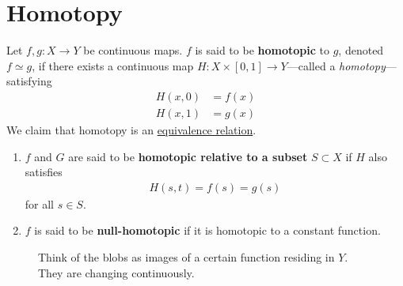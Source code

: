 \section{Homotopy} 

	\begin{definition}[Homotopy]
	  \label{def:homotopy}
		Let $f, g: X \to Y$ be continuous maps. $f$ is said to be \textbf{homotopic} to $g$, denoted $f \simeq g$, if there exists a continuous map $H: X \times [0, 1] \to Y$---called a \textit{homotopy}---satisfying 
		\begin{align}
			H(x, 0) & = f(x) \\ 
			H(x, 1) & = g(x) 
		\end{align}
		We claim that homotopy is an \hyperref[st-def:equivalence_relation]{equivalence relation}. 
		\begin{enumerate}
		  \item $f$ and $G$ are said to be \textbf{homotopic relative to a subset} $S \subset X$ if $H$ also satisfies 
				\begin{align}
					H(s, t) = f(s) = g(s)
				\end{align}
				for all $s \in S$. 

			\item $f$ is said to be \textbf{null-homotopic} if it is homotopic to a constant function. 
		\end{enumerate}

    \begin{figure}[H]
      \centering 
      \caption{Think of the blobs as images of a certain function residing in $Y$. They are changing continuously. }
      \label{fig:single_homotopy_class}
    \end{figure}
	\end{definition}
